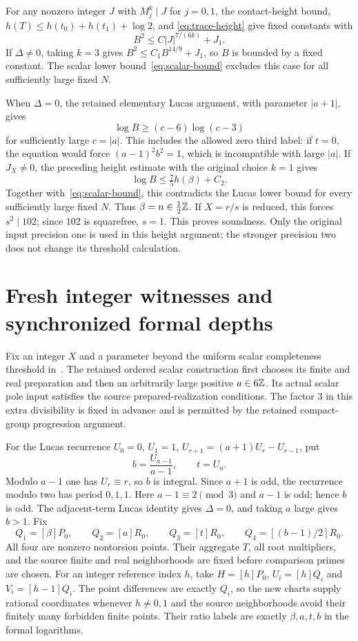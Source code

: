 \documentclass[11pt,a4paper]{article}
\begin{document}
For any nonzero integer $J$ with $M_j^k\mid J$ for $j=0,1$, the
contact-height bound, $h(T)\le h(t_0)+h(t_1)+\log2$, and
\eqref{eq:trace-height} give fixed constants with
\[
                         B^2\le C|J|^{7/(6k)}+J_1.
\]
If $\Delta\ne0$, taking $k=3$ gives
$B^2\le C_1B^{14/9}+J_1$, so $B$ is bounded by a fixed constant.
The scalar lower bound~\eqref{eq:scalar-bound} excludes this case
for all sufficiently large fixed $N$.

When $\Delta=0$, the retained elementary Lucas argument, with
parameter $|a+1|$, gives
\[
                         \log B\ge(c-6)\log(c-3)
\]
for sufficiently large $c=|a|$. This includes the allowed zero
third label: if $t=0$, the equation would force
$(a-1)^2b^2=1$, which is incompatible with large $|a|$.
If $J_X\ne0$, the preceding height estimate with the original
choice $k=1$ gives
\[
                 \log B\le \tfrac75h(\beta)+C_2.
\]
Together with~\eqref{eq:scalar-bound}, this contradicts the Lucas
lower bound for every sufficiently large fixed $N$. Thus
$\beta=n\in\tfrac12\mathbb Z$. If $X=r/s$ is reduced, this forces
$s^2\mid102$; since $102$ is squarefree, $s=1$. This proves soundness.
Only the original input precision one is used in this height argument;
the stronger precision two does not change its threshold calculation.

\section{Fresh integer witnesses and synchronized formal depths}

Fix an integer $X$ and a parameter beyond the uniform scalar
completeness threshold in~\cite{InverseVieta}. The retained ordered
scalar construction first chooses its finite and real preparation
and then an arbitrarily large positive $a\in6\mathbb Z$. Its actual scalar
pole input satisfies the source prepared-realization conditions.
The factor $3$ in this extra divisibility is fixed in advance and is
permitted by the retained compact-group progression argument.

For the Lucas recurrence $U_0=0$, $U_1=1$,
$U_{r+1}=(a+1)U_r-U_{r-1}$, put
\[
                   b=\frac{U_{a-1}}{a-1},\qquad t=U_a.
\]
Modulo $a-1$ one has $U_r\equiv r$, so $b$ is integral. Since
$a+1$ is odd, the recurrence modulo two has period $0,1,1$.
Here $a-1\equiv2\pmod3$ and $a-1$ is odd; hence $b$ is odd.
The adjacent-term Lucas identity gives $\Delta=0$, and taking $a$
large gives $b>1$. Fix
\[
 Q_1=[\beta]P_0,\qquad Q_2=[a]R_0,\qquad
 Q_3=[t]R_0,\qquad Q_4=[(b-1)/2]R_0.
\]
All four are nonzero nontorsion points. Their aggregate $T$, all
root multipliers, and the source finite and real neighborhoods are
fixed before comparison primes are chosen. For an integer reference
index $h$, take $H=[h]P_0$, $U_i=[h]Q_i$ and $V_i=[h-1]Q_i$.
The point differences are exactly $Q_i$, so the new charts supply
rational coordinates whenever $h\ne0,1$ and the source neighborhoods
avoid their finitely many forbidden finite points. Their ratio labels
are exactly $\beta,a,t,b$ in the formal logarithms.
\end{document}
